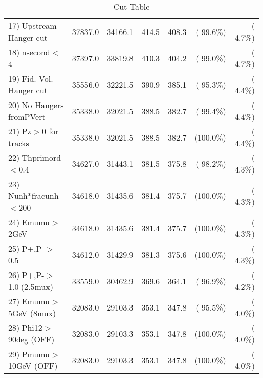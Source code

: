 \begin{table}[h!]
\begin{tabular}{||l||r|r|r|r|r|r||}
 17) Upstream Hanger cut  &      37837.0 &      34166.1 &        414.5 &        408.3 & ( 99.6\%) & (  4.7\%) \\
 18) nsecond$<$4          &      37397.0 &      33819.8 &        410.3 &        404.2 & ( 99.0\%) & (  4.7\%) \\
 19) Fid. Vol. Hanger cut &      35556.0 &      32221.5 &        390.9 &        385.1 & ( 95.3\%) & (  4.4\%) \\
 20) No Hangers fromPVert &      35338.0 &      32021.5 &        388.5 &        382.7 & ( 99.4\%) & (  4.4\%) \\
 21) Pz$>$0 for tracks    &      35338.0 &      32021.5 &        388.5 &        382.7 & (100.0\%) & (  4.4\%) \\
 22) Thprimord$<$0.4      &      34627.0 &      31443.1 &        381.5 &        375.8 & ( 98.2\%) & (  4.3\%) \\
 23) Nunh*fracunh$<$200   &      34618.0 &      31435.6 &        381.4 &        375.7 & (100.0\%) & (  4.3\%) \\
 24) Emumu$>$2GeV         &      34618.0 &      31435.6 &        381.4 &        375.7 & (100.0\%) & (  4.3\%) \\
 25) P+,P-$>$0.5          &      34612.0 &      31429.9 &        381.3 &        375.6 & (100.0\%) & (  4.3\%) \\
 26) P+,P-$>$1.0 (2.5mux) &      33559.0 &      30462.9 &        369.6 &        364.1 & ( 96.9\%) & (  4.2\%) \\
 27) Emumu$>$5GeV  (8mux) &      32083.0 &      29103.3 &        353.1 &        347.8 & ( 95.5\%) & (  4.0\%) \\
 28) Phi12$>$90deg  (OFF) &      32083.0 &      29103.3 &        353.1 &        347.8 & (100.0\%) & (  4.0\%) \\
 29) Pmumu$>$10GeV  (OFF) &      32083.0 &      29103.3 &        353.1 &        347.8 & (100.0\%) & (  4.0\%) \\
 \hline
 \hline
 \end{tabular}
 \caption{Cut Table           }
 \label{tab-cutcohjpsi-mumu_cohpip}
 \end{table}
